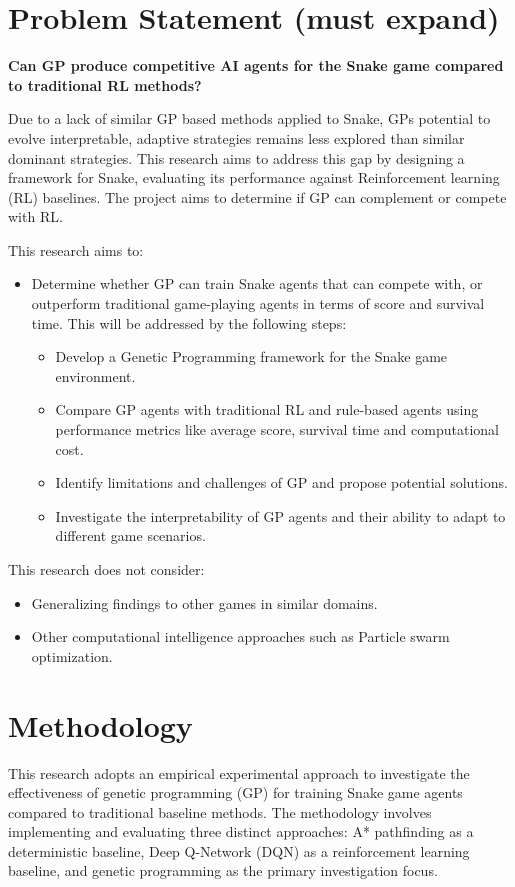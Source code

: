 \documentclass[a4paper,12pt]{article}
\begin{document}
\section{Problem Statement (must expand)}
\textbf{Can GP produce competitive AI agents for the Snake game compared to traditional RL methods?}

Due to a lack of similar GP based methods applied to Snake, GPs potential to evolve interpretable, adaptive strategies remains less explored than similar dominant strategies. 
This research aims to address this gap by designing a framework for Snake, 
evaluating its performance against Reinforcement learning (RL) baselines. 
The project aims to determine if GP can complement or compete with RL.

This research aims to:
\begin{itemize}
   \item Determine whether GP can train Snake agents that can compete with, 
   or outperform traditional game-playing agents in terms of score and survival time. This will be addressed by the following steps:
   \begin{itemize}
      \item Develop a Genetic Programming framework for the Snake game environment.
      \item Compare GP agents with traditional RL and rule-based agents using performance metrics like average score, survival time and computational cost.
      \item Identify limitations and challenges of GP and propose potential solutions.
      \item Investigate the interpretability of GP agents and their ability to adapt to different game scenarios.
   \end{itemize}
\end{itemize}

This research does not consider: 
\begin{itemize}
   \item Generalizing findings to other games in similar domains.
   \item Other computational intelligence approaches such as Particle swarm optimization.
\end{itemize}

\section{Methodology}

This research adopts an empirical experimental approach to investigate the effectiveness of genetic programming (GP) for training Snake game agents compared to traditional baseline methods. The methodology involves implementing and evaluating three distinct approaches: A* pathfinding as a deterministic baseline, Deep Q-Network (DQN) as a reinforcement learning baseline, and genetic programming as the primary investigation focus.
\end{document}

